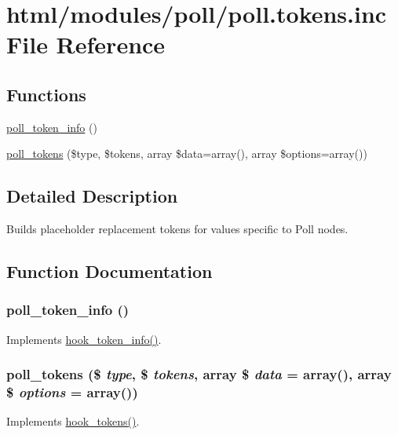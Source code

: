 \hypertarget{poll_8tokens_8inc}{
\section{html/modules/poll/poll.tokens.inc File Reference}
\label{poll_8tokens_8inc}
}
\subsection*{Functions}
\begin{DoxyCompactItemize}
\item 
\hyperlink{poll_8tokens_8inc_a74002ef79d450b1cc1fbb981904c7e6a}{poll\_\-token\_\-info} ()
\item 
\hyperlink{poll_8tokens_8inc_a5234b4d727774680583dc1abcfbb002d}{poll\_\-tokens} (\$type, \$tokens, array \$data=array(), array \$options=array())
\end{DoxyCompactItemize}


\subsection{Detailed Description}
Builds placeholder replacement tokens for values specific to Poll nodes. 

\subsection{Function Documentation}
\hypertarget{poll_8tokens_8inc_a74002ef79d450b1cc1fbb981904c7e6a}{
\subsubsection[{poll\_\-token\_\-info}]{\setlength{\rightskip}{0pt plus 5cm}poll\_\-token\_\-info ()}}
\label{poll_8tokens_8inc_a74002ef79d450b1cc1fbb981904c7e6a}
Implements \hyperlink{group__hooks_gab868597197cf36911f95dcd29ae0b954}{hook\_\-token\_\-info()}. \hypertarget{poll_8tokens_8inc_a5234b4d727774680583dc1abcfbb002d}{
\subsubsection[{poll\_\-tokens}]{\setlength{\rightskip}{0pt plus 5cm}poll\_\-tokens (\$ {\em type}, \/  \$ {\em tokens}, \/  array \$ {\em data} = {\ttfamily array()}, \/  array \$ {\em options} = {\ttfamily array()})}}
\label{poll_8tokens_8inc_a5234b4d727774680583dc1abcfbb002d}
Implements \hyperlink{group__hooks_ga3bfd87d9a19b2397b0f970e1cff7ea4f}{hook\_\-tokens()}. 
